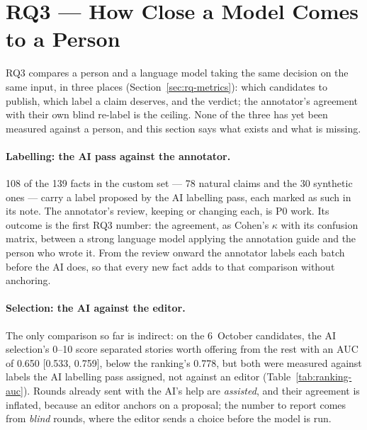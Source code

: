 
\section{RQ3 --- How Close a Model Comes to a Person}
\label{sec:results-rq3}

RQ3 compares a person and a language model taking the same decision on
the same input, in three places (Section~\ref{sec:rq-metrics}): which
candidates to publish, which label a claim deserves, and the verdict;
the annotator's agreement with their own blind re-label is the ceiling.
None of the three has yet been measured against a person, and this
section says what exists and what is missing.

\paragraph{Labelling: the AI pass against the annotator.} 108 of the
139 facts in the custom set --- 78 natural claims and the 30 synthetic
ones --- carry a label proposed by the AI labelling pass, each marked as
such in its note. The annotator's review, keeping or changing each, is
P0 work. Its outcome is the first RQ3 number: the agreement, as
Cohen's $\kappa$ with its confusion matrix, between a strong language
model applying the annotation guide and the person who wrote it. From
the review onward the annotator labels each batch before the AI does,
so that every new fact adds to that comparison without anchoring.

\paragraph{Selection: the AI against the editor.} The only comparison
so far is indirect: on the 6~October candidates, the AI selection's
0--10 score separated stories worth offering from the rest with an AUC
of 0.650 [0.533, 0.759], below the ranking's 0.778, but both were
measured against labels the AI labelling pass assigned, not against an
editor (Table~\ref{tab:ranking-auc}). Rounds already sent with the AI's
help are \emph{assisted}, and their agreement is inflated, because an
editor anchors on a proposal; the number to report comes from
\emph{blind} rounds, where the editor sends a choice before the model is
run.

